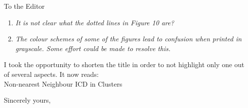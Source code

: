 \documentclass[DIN,pagenumber=false,parskip=half,fromalign=left,fromphone=true,fromemail=true,fromurl=false,fromlogo=false,fromrule=false]{scrlttr2}
\begin{document}
\begin{letter}{To the Editor}
\begin{enumerate}
 \item \emph{It is not clear what the dotted lines in Figure 10 are?}

 \item \emph{The colour schemes of some of the figures lead to confusion when printed in grayscale. Some effort could be made to resolve this.}

\end{enumerate}


I took the opportunity to shorten the title in order to not highlight only
one out of several aspects. It now reads:\\
      Non-nearest Neighbour ICD in 
      Clusters


        \closing{Sincerely yours,}
	\end{letter}
\end{document}
